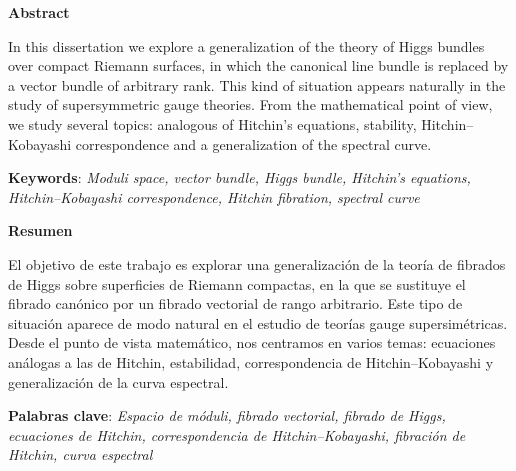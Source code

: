 \documentclass[12pt,a4paper]{book}
\theoremstyle{definition} \newtheorem{defn}[thm]{Definition}
\theoremstyle{definition} \newtheorem{ejemplo}[thm]{Example}
\theoremstyle{remark} \newtheorem{rem}[thm]{Remark}
\begin{document}
\newpage\thispagestyle{empty}
\vspace*{3cm}
\begin{center}
  \textbf{Abstract}
\end{center}
  In this dissertation we explore a generalization of the theory of Higgs bundles over compact Riemann surfaces, in which the canonical line bundle is replaced by a vector bundle of arbitrary rank. This kind of situation appears naturally in the study of supersymmetric gauge theories. From the mathematical point of view, we study several topics: analogous of Hitchin's equations, stability, Hitchin--Kobayashi correspondence and a generalization of the spectral curve.

  \vspace{.5 cm}

  \noindent \textbf{Keywords}: \textit{Moduli space, vector bundle, Higgs bundle, Hitchin's equations, Hitchin--Kobayashi correspondence, Hitchin fibration, spectral curve}


\begin{center}
  \textbf{Resumen}
\end{center}

  El objetivo de este trabajo es explorar una generalización de la
 teoría de fibrados de Higgs sobre superficies de Riemann compactas,
  en la que se sustituye el fibrado canónico por un fibrado vectorial de rango arbitrario. Este tipo de situación aparece de modo natural en el estudio de teorías gauge supersimétricas. Desde el punto de vista matemático, nos centramos en varios temas: ecuaciones análogas a las de Hitchin, estabilidad, correspondencia de Hitchin--Kobayashi y generalización de la curva espectral.

  \vspace{.5 cm}

  \noindent \textbf{Palabras clave}: \textit{Espacio de móduli, fibrado vectorial, fibrado de Higgs, ecuaciones de Hitchin, correspondencia de Hitchin--Kobayashi, fibración de Hitchin, curva espectral}
\end{document}

